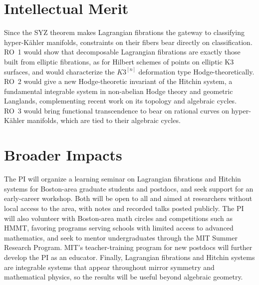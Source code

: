 \documentclass[11pt]{article}
\begin{document}
\section*{Intellectual Merit}

Since the SYZ theorem makes Lagrangian fibrations the gateway to classifying hyper-K\"ahler
manifolds, constraints on their fibers bear directly on classification. RO~1 would show that
decomposable Lagrangian fibrations are exactly those built from elliptic fibrations, as for
Hilbert schemes of points on elliptic K3 surfaces, and would characterize the $K3^{[n]}$
deformation type Hodge-theoretically. RO~2 would give a new Hodge-theoretic invariant of the
Hitchin system, a fundamental integrable system in non-abelian Hodge theory and geometric
Langlands, complementing recent work on its topology and algebraic cycles. RO~3 would bring
functional transcendence to bear on rational curves on hyper-K\"ahler manifolds, which are
tied to their algebraic cycles.

\section*{Broader Impacts}

The PI will organize a learning seminar on Lagrangian fibrations and Hitchin systems for
Boston-area graduate students and postdocs, and seek support for an early-career workshop.
Both will be open to all and aimed at researchers without local access to the area, with
notes and recorded talks posted publicly. The PI will also volunteer with Boston-area math
circles and competitions such as HMMT, favoring programs serving schools with limited
access to advanced mathematics, and seek to mentor undergraduates through the MIT Summer
Research Program. MIT's teacher-training program for new postdocs will further develop the
PI as an educator. Finally, Lagrangian fibrations and Hitchin systems are integrable systems
that appear throughout mirror symmetry and mathematical physics, so the results will be
useful beyond algebraic geometry.
\end{document}
